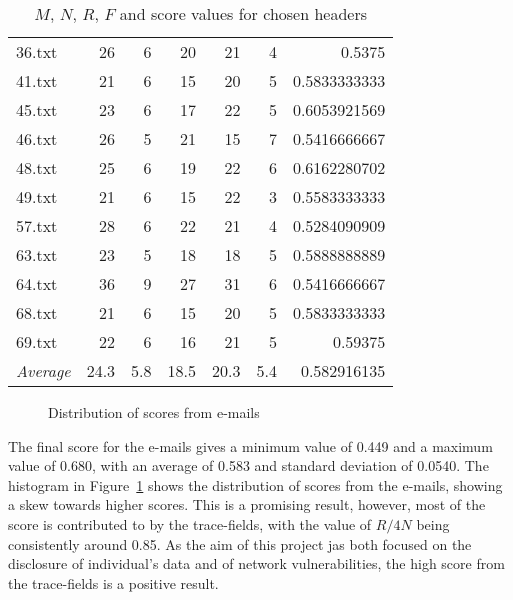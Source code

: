 \begin{table}
\begin{tabular}{@{}lrrrrrr@{}}
36.txt & 26           & 6                     & 20   & 21  & 4   & 0.5375         \\
41.txt & 21           & 6                     & 15   & 20  & 5   & 0.5833333333   \\
45.txt & 23           & 6                     & 17   & 22  & 5   & 0.6053921569   \\
46.txt & 26           & 5                     & 21   & 15  & 7   & 0.5416666667   \\
48.txt & 25           & 6                     & 19   & 22  & 6   & 0.6162280702   \\
49.txt & 21           & 6                     & 15   & 22  & 3   & 0.5583333333   \\
57.txt & 28           & 6                     & 22   & 21  & 4   & 0.5284090909   \\
63.txt & 23           & 5                     & 18   & 18  & 5   & 0.5888888889   \\
64.txt & 36           & 9                     & 27   & 31  & 6   & 0.5416666667   \\
68.txt & 21           & 6                     & 15   & 20  & 5   & 0.5833333333   \\
69.txt & 22           & 6                     & 16   & 21  & 5   & 0.59375        \\ \midrule
\emph{Average} & 24.3 & 5.8                   & 18.5 & 20.3& 5.4 & 0.582916135    \\ \bottomrule
\end{tabular}
\caption{$M$, $N$, $R$, $F$ and score values for chosen headers}
\label{tab:sammn}
\end{table}

\begin{figure}
	\centering{}
\caption{Distribution of scores from e-mails}\label{fig:dis}
\end{figure}

The final score for the e-mails gives a minimum value of 0.449 and a maximum
value of 0.680, with an average of 0.583 and standard deviation of 0.0540. The
histogram in Figure~\ref{fig:dis} shows the distribution of scores from the
e-mails, showing a skew towards higher scores.  This is a promising result,
however, most of the score is contributed to by the trace-fields, with the 
value of $R/4N$ being consistently around 0.85.  As the aim of this project
jas both focused on the disclosure of individual's data and of network
vulnerabilities, the high score from the trace-fields is a positive result.

